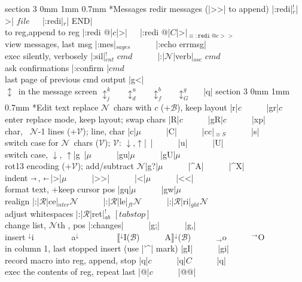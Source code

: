 \documentclass[10pt,a4paper,landscape]{article}
\makeatletter
\renewcommand{\section}{\@startsection		%
	{section}
	{3}
	{0mm}
	{1mm}
	{0.7mm}
	{\normalfont\bfseries\footnotesize}}
\newcommand{\toleft}{$\shortleftarrow$}
\newcommand{\toright}{$\shortrightarrow$}
\newcommand{\toend}{{\small\ForwardToEnd}}
\newcommand{\up}{$\uparrow$}
\newcommand{\down}{$\downarrow$}
\newcommand{\ibeg}{$\llbracket$}
\newcommand{\iend}{$\rrbracket$}
\newcommand{\eqv}[1]{$_{\equiv #1}$}
\newcommand{\opt}[1]{$_{#1}$}
\newcommand{\OPT}[2]{$_{#1}^{#2}$}
\newcommand{\after}[1]{#1$^\downarrow$}
\newcommand{\before}[1]{ $^\downarrow$#1}
\newcommand{\B}{{\footnotesize$\mathcal{B}$}}
\newcommand{\N}{{\footnotesize$\mathcal{N}$}}
\newcommand{\R}{{\footnotesize$\mathcal{R}$}}
\newcommand{\V}{{\footnotesize$\mathcal{V}$}}
\newcommand{\w}{{~~~}}
\newcommand{\next}{{\small\leftpointright}}
\newcommand{\prev}{{\small\rightpointleft}}
\makeatother
\begin{document}
\begin{multicols}{4}
{{\section*{Messages}
redir messages (|>>| to append)	    \dotfill|:redi|\OPT{r}{!}| >| $file$\w|:redi|\opt{r}| END|\\
to reg,append to reg		    \dotfill|:redi @|$c$|>|\w|:redi @|$C$|>|\eqv{\mathtt{:redi~@}c>>}\\
view messages, last msg		    \dotfill|:mes|\opt{sages}\w\w|:echo errmsg|\\
exec silently, verbosely	    \dotfill|:sil|\OPT{ent}{!} $cmd$\w\w|:|\N|verb|\opt{ose} $cmd$\\
ask confirmations		    \dotfill|:confirm |$cmd$\\
last page of previous cmd output    \dotfill|g<|\\
$\updownarrow$~in the message screen	     \dotfill$\updownarrow^k_j$\w$\updownarrow^u_d$\w$\updownarrow^b_f$\w$\updownarrow^g_G$\w|q|
\section*{Edit text}
replace \N~chars with $c$ (+\B), keep layout	\dotfill|r|$c$\w\w|gr|$c$\\
enter replace mode, keep layout; swap chars	\dotfill|R|$c$\w\w|gR|$c$\w\w|xp|\\
char, \toend~\N-1 lines (+\V); line, char	\dotfill|c|$\mu$\w\w|C|\w\w|cc|\eqv{S}\w\w|s|\\
switch case for \N~chars (\V); \V: \down,\up	\dotfill|~|\w\w|u|\w\w|U|\\
switch case, \down, \up				\dotfill|g~|$\mu$\w\w|gu|$\mu$\w\w|gU|$\mu$\\
rot13 encoding (+\V); add/subtract \N	\dotfill|g?|$\mu$\w\w|^A|\w\w|^X|\\
indent \toright, \toleft	    \dotfill|>|$\mu$\w\w|>>|\w\w|<|$\mu$\w\w|<<|\\
format text, +keep cursor pos	    \dotfill|gq|$\mu$\w\w|gw|$\mu$\\
realign				    \dotfill|:|\R|ce|\opt{nter}\N\w\w|:|\R|le|\opt{ft}\N\w\w|:|\R|ri|\opt{ght}\N\\
adjust whitespaces		    \dotfill|:|\R|ret|\OPT{ab}{!} $[tabstop]$\\
change list, {\N}th \prev, \next pos		    \dotfill|:changes|\w\w|g;|\w\w|g,|\\
insert	\dotfill\before{i}\w\w\w\after{a}\w\w\w\after{\ibeg}I(\B)\w\w\after{A\iend}(\B)\w\w$_\rightarrow$o\w\w$^\rightarrow$O\\
in column 1, last stopped insert (use |'^| mark)	\dotfill|gI|\w\w|gi|\\
record macro into reg, append, stop	\dotfill|q|$c$\w\w|q|$C$\w\w|q|\\
exec the contents of reg, repeat last	\dotfill|@|$c$\w\w|@@|
}}
\end{multicols}
\end{document}
